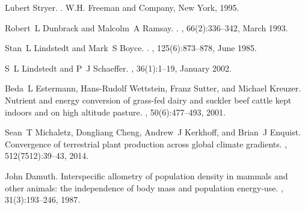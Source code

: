 \documentclass[twocolumn,preprintnumbers,amsmath,amssymb,superscriptaddress]{revtex4}
\begin{document}
\begin{bibunit}[unsrt]
\begin{thebibliography}{10}
Lubert Stryer.
.
\newblock W.H. Freeman and Company, New York, 1995.

Robert~L Dunbrack and Malcolm~A Ramsay.
.
, 66(2):336--342, March 1993.

Stan~L Lindstedt and Mark~S Boyce.
.
, 125(6):873--878, June 1985.

S~L Lindstedt and P~J Schaeffer.
, 36(1):1--19, January 2002.

Beda~L Estermann, Hans-Rudolf Wettstein, Franz Sutter, and Michael Kreuzer.
\newblock Nutrient and energy conversion of grass-fed dairy and suckler beef
  cattle kept indoors and on high altitude pasture.
, 50(6):477--493, 2001.

Sean~T Michaletz, Dongliang Cheng, Andrew~J Kerkhoff, and Brian~J Enquist.
\newblock Convergence of terrestrial plant production across global climate
  gradients.
, 512(7512):39--43, 2014.

John Damuth.
\newblock Interspecific allometry of population density in mammals and other
  animals: the independence of body mass and population energy-use.
, 31(3):193--246,
  1987.

\end{thebibliography}


\end{bibunit}
\end{document}

